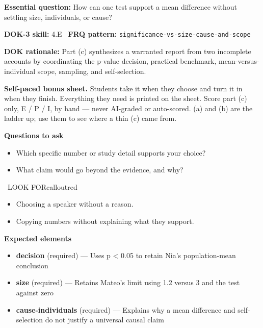 \documentclass[11pt]{article}
\begin{document}
\textbf{Essential question:} How can one test support a mean difference without settling size, individuals, or cause?\par
\textbf{DOK-3 skill:} 4.E \textperiodcentered\ \textbf{FRQ pattern:} {\small\texttt{significance-\allowbreak{}vs-\allowbreak{}size-\allowbreak{}cause-\allowbreak{}and-\allowbreak{}scope}}\par
\textbf{DOK rationale:} Part (c) synthesizes a warranted report from two incomplete accounts by coordinating the p-value decision, practical benchmark, mean-versus-individual scope, sampling, and self-selection.\par

\textbf{Self-paced bonus sheet.} Students take it when they choose and turn it in when they finish. Everything they need is printed on the sheet. Score part (c) only, E / P / I, by hand --- never AI-graded or auto-scored. (a) and (b) are the ladder up; use them to see where a thin (c) came from.\par

\textbf{Questions to ask}
\begin{itemize}[leftmargin=1.5em,itemsep=2pt,topsep=2pt]
  \item Which specific number or study detail supports your choice?
  \item What claim would go beyond the evidence, and why?
\end{itemize}

\begin{callout}{\IconWarn\ LOOK FOR}{calloutred}
\begin{itemize}[leftmargin=1.5em,itemsep=2pt,topsep=2pt]
  \item Choosing a speaker without a reason.
  \item Copying numbers without explaining what they support.
\end{itemize}
\end{callout}


\textbf{Expected elements}
\begin{itemize}[leftmargin=1.5em,itemsep=2pt,topsep=2pt]
  \item \textbf{decision} (required) --- Uses p < 0.05 to retain Nia's population-mean conclusion
  \item \textbf{size} (required) --- Retains Mateo's limit using 1.2 versus 3 and the test against zero
  \item \textbf{cause-individuals} (required) --- Explains why a mean difference and self-selection do not justify a universal causal claim
\end{itemize}
\end{document}
